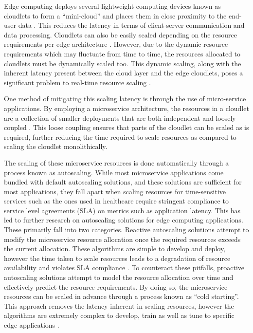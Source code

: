 Edge computing deploys several lightweight computing devices known as cloudlets to form a ``mini-cloud'' and places them in close proximity to the end-user data \cite{liu2019survey}. This reduces the latency in terms of client-server communication and data processing. Cloudlets can also be easily scaled depending on the resource requirements per edge architecture \cite{ren2019survey}. However, due to the dynamic resource requirements which may fluctuate from time to time, the resources allocated to cloudlets must be dynamically scaled too. This dynamic scaling, along with the inherent latency present between the cloud layer and the edge cloudlets, poses a significant problem to real-time resource scaling \cite{varghese2016challenges}.\par
One method of mitigating this scaling latency is through the use of micro-service applications. By employing a microservice architecture, the resources in a cloudlet are a collection of smaller deployments that are both independent and loosely coupled \cite{villamizar2015evaluating}. This loose coupling ensures that parts of the cloudlet can be scaled as is required, further reducing the time required to scale resources as compared to scaling the cloudlet monolithically.\par

The scaling of these microservice resources is done automatically through a process known as autoscaling. While most microservice applications come bundled with default autoscaling solutions, and these solutions are sufficient for most applications, they fall apart when scaling resources for time-sensitive services such as the ones used in healthcare require stringent compliance to service level agreements (SLA) on metrics such as application latency. This has led to further research on autoscaling solutions for edge computing applications. These primarily fall into two categories. Reactive autoscaling solutions attempt to modify the microservice resource allocation once the required resources exceeds the current allocation. These algorithms are simple to develop and deploy, however the time taken to scale resources leads to a degradation of resource availability and violates SLA compliance \cite{podolskiy2018iaas}. To counteract these pitfalls, proactive autoscaling solutions attempt to model the resource allocation over time and effectively predict the resource requirements. By doing so, the microservice resources can be scaled in advance through a process known as ``cold starting''. This approach removes the latency inherent in scaling resources, however the algorithms are extremely complex to develop, train as well as tune to specific edge applications \cite{straesser2022not}.

